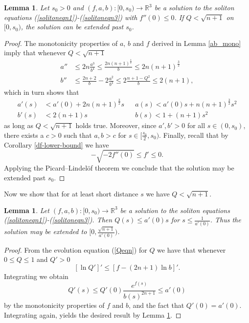 \documentclass{amsart}
\newtheorem{lem}[thm]{Lemma}
\theoremstyle{definition}
\theoremstyle{remark}
\numberwithin{equation}{section}
\newcommand{\R}{\mathbb{R}}  %
\begin{document}
\begin{lem}
\label{Qcontrol}
Let $s_0>0$ and $(f,a,b): [0, s_0) \rightarrow \R^3$ be a solution to the soliton equations (\ref{solitoneqn1})-(\ref{solitoneqn3}) with $f''(0) \leq 0$. If $Q < \sqrt{n+1}$ on $[0, s_0)$, the solution can be extended past $s_0$.
\end{lem}

\begin{proof}
The monotonicity properties of $a$, $b$ and $f$ derived in Lemma \ref{ab_mono} imply that whenever $Q< \sqrt{n+1}$
\begin{align*}
a'' &\leq 2n\frac{a^3}{b^4} \leq \frac{2n(n+1)^{\frac{3}{2}}}{b} \leq  2n(n+1)^{\frac{3}{2}}\\
b'' &\leq\frac{2n+2}{b} - 2\frac{a^2}{b^3}\leq 2 \frac{n+1-Q^2}{b} \leq 2 (n+1),
\end{align*}
which in turn shows that
\begin{align*}
a'(s) &< a'(0) + 2n(n+1)^{\frac{3}{2}}s && a(s) <  a'(0) s +  n(n+1)^{\frac{3}{2}} s^2 \\
b'(s) &< 2(n+1)s && b(s) < 1 + (n+1) s^2 
\end{align*}
as long as $Q < \sqrt{n+1}$ holds true. Moreover, since $a', b' > 0$ for all $s \in (0,s_0)$, there exists a $c>0$ such that $a, b > c$ for $s \in [\frac{s_0}{2}, s_0)$. Finally, recall that by Corollary \ref{df-lower-bound} we have
\begin{equation*}
 -\sqrt{-2f''(0)} \leq f' \leq 0.
\end{equation*}
Applying the Picard–Lindelöf theorem we conclude that the solution may be extended past $s_0$.

\end{proof}
Now we show that for at least short distance $s$ we have $Q < \sqrt{n+1}$.

\begin{lem}
\label{Qbound}
Let $(f,a,b): [0, s_0) \rightarrow \R^3$ be a solution to the soliton equations (\ref{solitoneqn1})-(\ref{solitoneqn3}). Then $Q(s) \leq a'(0)s$ for $s \leq \frac{1}{a'(0)}$. Thus the solution may be extended to $[0,\frac{\sqrt{n+1}}{a'(0)})$.
\end{lem}
\begin{proof}
From the evolution equation (\ref{Qeqn}) for $Q$ we have that whenever $0\leq Q \leq 1$ and $Q'>0$ 
\begin{equation*}
\left[\ln Q'\right]' \leq \left[f -(2n+1) \ln b \right]'.
\end{equation*}
Integrating we obtain
\begin{equation}
\label{Qineq}
Q'(s)\leq Q'(0) \frac{e^{f(s)}}{b(s)^{2n+1}} \leq a'(0)
\end{equation}
by the monotonicity properties of $f$ and $b$, and the fact that $Q'(0) = a'(0)$. Integrating again, yields the desired result by Lemma \ref{Qcontrol}.
\end{proof}
\end{document}
